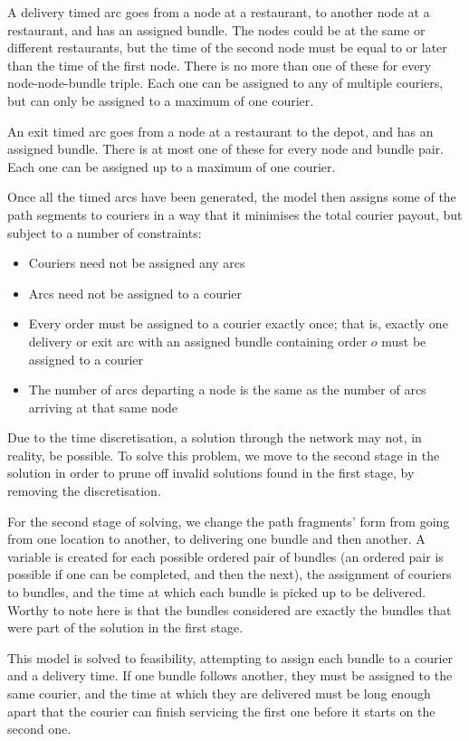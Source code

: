 \documentclass{article}
\begin{document}
A delivery timed arc goes from a node at a restaurant, to another node at a restaurant, and has an assigned bundle. The nodes could be at the same or different restaurants, but the time of the second node must be equal to or later than the time of the first node. There is no more than one of these for every node-node-bundle triple. Each one can be assigned to any of multiple couriers, but can only be assigned to a maximum of one courier.

An exit timed arc goes from a node at a restaurant to the depot, and has an assigned bundle. There is at most one of these for every node and bundle pair. Each one can be assigned up to a maximum of one courier.

Once all the timed arcs have been generated, the model then assigns some of the path segments to couriers in a way that it minimises the total courier payout, but subject to a number of constraints:

\begin{itemize}
\item Couriers need not be assigned any arcs
\item Arcs need not be assigned to a courier
\item Every order must be assigned to a courier exactly once; that is, exactly one delivery or exit arc with an assigned bundle containing order $o$ must be assigned to a courier
\item The number of arcs departing a node is the same as the number of arcs arriving at that same node
\end{itemize}

Due to the time discretisation, a solution through the network may not, in reality, be possible. To solve this problem, we move to the second stage in the solution in order to prune off invalid solutions found in the first stage, by removing the discretisation.

For the second stage of solving, we change the path fragments' form from going from one location to another, to delivering one bundle and then another. A variable is created for each possible ordered pair of bundles (an ordered pair is possible if one can be completed, and then the next), the assignment of couriers to bundles, and the time at which each bundle is picked up to be delivered. Worthy to note here is that the bundles considered are exactly the bundles that were part of the solution in the first stage.

This model is solved to feasibility, attempting to assign each bundle to a courier and a delivery time. If one bundle follows another, they must be assigned to the same courier, and the time at which they are delivered must be long enough apart that the courier can finish servicing the first one before it starts on the second one.
\end{document}
